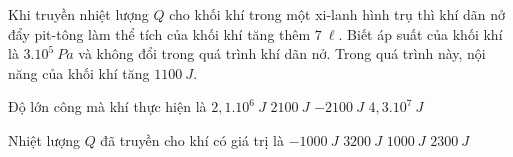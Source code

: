 \begin{vidu}
Khi truyền nhiệt lượng $Q$ cho khối khí trong một xi-lanh hình trụ thì khí dãn nở đẩy pit-tông làm thể tích của khối khí tăng thêm $7\ \ell$. Biết áp suất của khối khí là $3.10^5\ Pa$ và không đổi trong quá trình khí dãn nở. Trong quá trình này, nội năng của khối khí tăng $1100\ J$.
\begin{vdc}
Độ lớn công mà khí thực hiện là
\choice
{$2,1.10^6\ J$}
{\True $2100\ J$}
{$-2100\ J$}
{$4,3.10^7\ J$}

\end{vdc}
\begin{vdc}
Nhiệt lượng $Q$ đã truyền cho khí có giá trị là
\choice
{$-1000\ J$}
{\True $3200\ J$}
{$1000\ J$}
{$2300\ J$}

\end{vdc}
\end{vidu}




